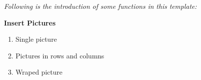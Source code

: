 \newpage
\textit{Following is the introduction of some functions in this template:} \\
\vspace{1cm}

\vspace{1cm}

\begin{problem}[1]
	\textbf{Insert Pictures}
	\begin{enumerate}[nosep,label=(\arabic*)]
    \item Single picture
		\item Pictures in rows and columns
		\item Wraped picture
	\end{enumerate}
\end{problem}


